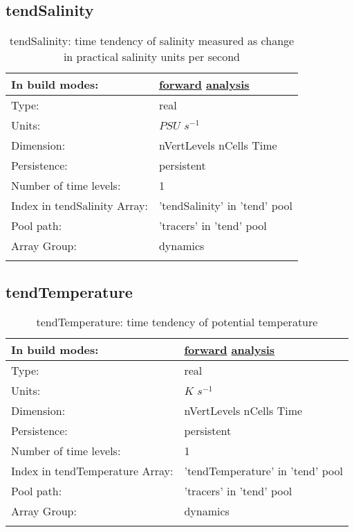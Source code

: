 \subsection[tendSalinity]{tendSalinity}
\label{subsec:var_sec_tend_tendSalinity}
\begin{center}
\begin{longtable}{| p{2.0in} | p{4.0in} |}
        \hline 
        In build modes: & \hyperref[subsec:forward_var_tab_tend]{forward} \hyperref[subsec:analysis_var_tab_tend]{analysis} \\
        \hline 
        Type: & real \\
        \hline 
        Units: & $PSU$ $s^{-1}$ \\
        \hline 
        Dimension: & nVertLevels nCells Time \\
        \hline 
        Persistence: & persistent \\
        \hline 
        Number of time levels: & 1 \\
        \hline 
		 Index in tendSalinity Array: & 'tendSalinity' in 'tend' pool \\
		 \hline 
            Pool path: & 'tracers' in 'tend' pool
 \\
		 \hline 
		 Array Group: & dynamics \\
		 \hline 
    \caption{tendSalinity: time tendency of salinity measured as change in practical salinity units per second}
\end{longtable}
\end{center}
\subsection[tendTemperature]{tendTemperature}
\label{subsec:var_sec_tend_tendTemperature}
\begin{center}
\begin{longtable}{| p{2.0in} | p{4.0in} |}
        \hline 
        In build modes: & \hyperref[subsec:forward_var_tab_tend]{forward} \hyperref[subsec:analysis_var_tab_tend]{analysis} \\
        \hline 
        Type: & real \\
        \hline 
        Units: & $K$ $s^{-1}$ \\
        \hline 
        Dimension: & nVertLevels nCells Time \\
        \hline 
        Persistence: & persistent \\
        \hline 
        Number of time levels: & 1 \\
        \hline 
		 Index in tendTemperature Array: & 'tendTemperature' in 'tend' pool \\
		 \hline 
            Pool path: & 'tracers' in 'tend' pool
 \\
		 \hline 
		 Array Group: & dynamics \\
		 \hline 
    \caption{tendTemperature: time tendency of potential temperature}
\end{longtable}
\end{center}
